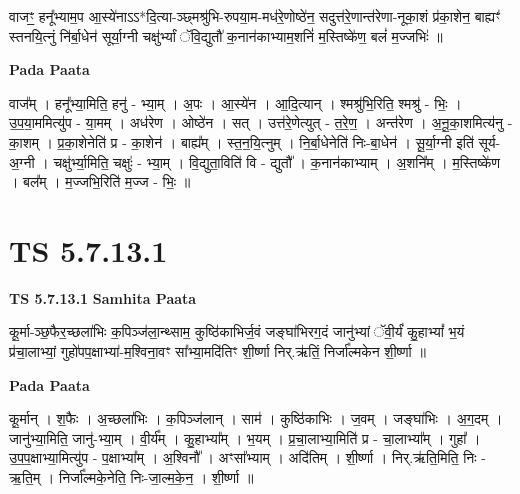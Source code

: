 \documentclass[17pt]{extarticle}
\begin{document}
वाजꣳ॒॒ हनू᳚भ्याम॒प आ॒स्ये॑नाऽऽ*दि॒त्या-ञ्छ्मश्रु॑भि-रुपया॒म-मध॑रे॒णोष्ठे॑न॒ सदुत्त॑रे॒णान्त॑रेणा-नूका॒शं प्र॑का॒शेन॒ बाह्यꣳ॑ स्तनयि॒त्नुं नि॑र्बा॒धेन॑ सूर्या॒ग्नी चक्षु॑र्भ्यां ॅवि॒द्युतौ॑ क॒नान॑काभ्याम॒शनिं॑ म॒स्तिष्के॑ण॒ बलं॑ म॒ज्जभिः॑ ॥ \newline

\textbf{Pada Paata} \newline

वाज᳚म् । हनू᳚भ्या॒मिति॒ हनु॑ - भ्या॒म् । अ॒पः । आ॒स्ये॑न । आ॒दि॒त्यान् । श्मश्रु॑भि॒रिति॒ श्मश्रु॑ - भिः॒ । उ॒प॒या॒ममित्यु॑प - या॒मम् । अध॑रेण । ओष्ठे॑न । सत् । उत्त॑रे॒णेत्युत् - त॒रे॒ण॒ । अन्त॑रेण । अ॒नू॒का॒शमित्य॑नु - का॒शम् । प्र॒का॒शेनेति॑ प्र - का॒शेन॑ । बाह्य᳚म् । स्त॒न॒यि॒त्नुम् । नि॒र्बा॒धेनेति॑ निः-बा॒धेन॑ । सू॒र्या॒ग्नी इति॑ सूर्य-अ॒ग्नी । चक्षु॑र्भ्या॒मिति॒ चक्षुः॑ - भ्या॒म् । वि॒द्युता॒विति॑ वि - द्युतौ᳚ । क॒नान॑काभ्याम् । अ॒शनि᳚म् । म॒स्तिष्के॑ण । बल᳚म् । म॒ज्जभि॒रिति॑ म॒ज्ज - भिः॒ ॥  \newline




\section*{ TS 5.7.13.1 }

\textbf{TS 5.7.13.1 } \newline
\textbf{Samhita Paata} \newline

कू॒र्मा-ञ्छ॒फैर॒च्छला॑भिः क॒पिञ्ज॑ला॒न्थ्साम॒ कुष्ठि॑काभिर्ज॒वं जङ्घा॑भिरग॒दं जानु॑भ्यां ॅवी॒र्यं॑ कु॒हाभ्यां᳚ भ॒यं प्र॑चा॒लाभ्यां॒ गुहो॑पप॒क्षाभ्या॑-म॒श्विना॒वꣳ सा᳚भ्या॒मदि॑तिꣳ शी॒र्ष्णा निर्.ऋ॑तिं॒ निर्जा᳚ल्मकेन शी॒र्ष्णा ॥ \newline

\textbf{Pada Paata} \newline

कू॒र्मान् । श॒फैः । अ॒च्छला॑भिः । क॒पिञ्ज॑लान् । साम॑ । कुष्ठि॑काभिः । ज॒वम् । जङ्घा॑भिः । अ॒ग॒दम् । जानु॑भ्या॒मिति॒ जानु॑-भ्या॒म् । वी॒र्य᳚म् । कु॒हाभ्या᳚म् । भ॒यम् । प्र॒चा॒लाभ्या॒मिति॑ प्र - चा॒लाभ्या᳚म् । गुहा᳚ । उ॒प॒प॒क्षाभ्या॒मित्यु॑प - प॒क्षाभ्या᳚म् । अ॒श्विनौ᳚ । अꣳसा᳚भ्याम् । अदि॑तिम् । शी॒र्ष्णा । निर्.ऋ॑ति॒मिति॒ निः - ऋ॒ति॒म् । निर्जा᳚ल्मके॒नेति॒ निः-जा॒ल्म॒के॒न॒ । शी॒र्ष्णा ॥  \newline




\end{document}

